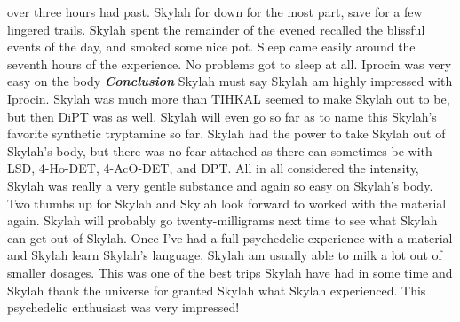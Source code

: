 \documentclass[12pt]{book}
\begin{document}
over three hours had past. Skylah for down for the most part, save for a few lingered trails. Skylah spent the remainder of the evened recalled the blissful events of the day, and smoked some nice pot. Sleep came easily around the seventh hours of the experience. No problems got to sleep at all. Iprocin was very easy on the body \emph{\textbf{Conclusion}} Skylah must say Skylah am highly impressed with Iprocin. Skylah was much more than TIHKAL seemed to make Skylah out to be, but then DiPT was as well. Skylah will even go so far as to name this Skylah's favorite synthetic tryptamine so far. Skylah had the power to take Skylah out of Skylah's body, but there was no fear attached as there can sometimes be with LSD, 4-Ho-DET, 4-AcO-DET, and DPT. All in all considered the intensity, Skylah was really a very gentle substance and again so easy on Skylah's body. Two thumbs up for Skylah and Skylah look forward to worked with the material again. Skylah will probably go twenty-milligrams next time to see what Skylah can get out of Skylah. Once I've had a full psychedelic experience with a material and Skylah learn Skylah's language, Skylah am usually able to milk a lot out of smaller dosages. This was one of the best trips Skylah have had in some time and Skylah thank the universe for granted Skylah what Skylah experienced. This psychedelic enthusiast was very impressed!
\end{document}
